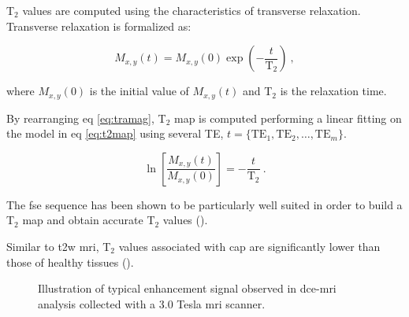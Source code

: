 \begin{enumerate}[leftmargin=*]
T$_2$ values are computed using the characteristics of transverse relaxation. Transverse relaxation is formalized as:

\begin{equation}
	M_{x,y}(t) = M_{x,y}(0) \exp \left( - \frac{t}{\text{T}_2} \right) \ ,
	\label{eq:tramag}
\end{equation}

\noindent where $M_{x,y}(0)$ is the initial value of $M_{x,y}(t)$ and T$_2$ is the relaxation time.

By rearranging \acs{eq} \ref{eq:tramag}, T$_2$ map is computed performing a linear fitting on the model in \acs{eq} \ref{eq:t2map} using several TE, $t=\{ \text{TE}_1,\text{TE}_2, \dotsc ,\text{TE}_m \}$.

\begin{equation}
	\ln \left[ \frac{M_{x,y}(t)}{M_{x,y}(0)} \right] = - \frac{t}{\text{T}_2} \ .
	\label{eq:t2map}
\end{equation}

The \Ac{fse} sequence has been shown to be particularly well suited in order to build a T$_2$ map and obtain accurate T$_2$ values (\cite{Liney1996a}).

Similar to \ac{t2w} \ac{mri}, T$_2$ values associated with \ac{cap} are significantly lower than those of healthy tissues (\cite{Liney1996,Gibbs2001}).

\begin{figure}
\centering
	\hspace*{\fill}
	 \hfill
	\hspace*{\fill}
	\caption{Illustration of typical enhancement signal observed in \ac{dce}-\ac{mri} analysis collected with a 3.0 Tesla \ac{mri} scanner.}
	\label{fig:dceana}
\end{figure}


\end{enumerate}
